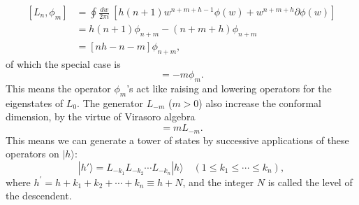 \documentclass[aps,prb,superscriptaddress,nofootinbib]{revtex4}
\begin{document}
\begin{equation}
\begin{aligned}
	\left[L_n, \phi_m\right]
	&= \oint \frac{dw}{2\pi i}\ \left[h(n+1) w^{n+m+h-1} \phi(w)+w^{n+m+h} \partial \phi(w) \right] \\
	&= h(n+1) \phi_{n+m} - (n+m+h)\phi_{n+m} \\
	&= [nh-n-m] \phi_{n+m},
\end{aligned}
\end{equation}
of which the special case is 
\begin{equation}
	[L_0, \phi_m] = -m \phi_m.
\end{equation}
This means the operator $\phi_m$'s act like raising and lowering operators for the eigenstates of $L_0$.
The generator $L_{-m}$ ($m>0$) also increase the conformal dimension, by the virtue of Virasoro algebra 
\begin{equation}
	[L_0, L_{-m}] = m L_{-m}.
\end{equation}
This means we can generate a tower of states by successive applications of these operators on $|h\rangle$:
\begin{equation}
	|h'\rangle = L_{-k_{1}} L_{-k_{2}} \cdots L_{-k_{n}}|h\rangle \quad\left(1 \leq k_{1} \leq \cdots \leq k_{n}\right),
\end{equation}
where $h^{\prime}=h+k_{1}+k_{2}+\cdots+k_{n} \equiv h+N$, and the integer $N$ is called the level of the descendent. 
\end{document}
